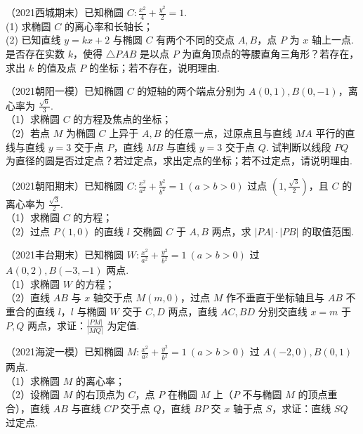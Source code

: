 \begin{exercise} %
（2021西城期末）已知椭圆 $C:\frac{x^{2}}{4}+\frac{y^{2}}{2}=1$.\\
(1) 求椭圆 $C$ 的离心率和长轴长；\\
(2) 已知直线 $y=kx+2$ 与椭圆 $C$ 有两个不同的交点 $A,B$，点 $P$ 为 $x$ 轴上一点. 是否存在实数 $k$，使得 $\triangle PAB$ 是以点 $P$ 为直角顶点的等腰直角三角形？若存在，求出 $k$ 的值及点 $P$ 的坐标；若不存在，说明理由.
\end{exercise}

\begin{exercise} %
（2021朝阳一模）已知椭圆 $C$ 的短轴的两个端点分别为 $A(0,1),B(0,-1)$，离心率为 $\frac{\sqrt{6}}{3}$.\\
（1）求椭圆 $C$ 的方程及焦点的坐标；\\
（2）若点 $M$ 为椭圆 $C$ 上异于 $A,B$ 的任意一点，过原点且与直线 $MA$ 平行的直线与直线 $y=3$ 交于点 $P$，直线 $MB$ 与直线 $y=3$ 交于点 $Q$. 试判断以线段 $PQ$ 为直径的圆是否过定点？若过定点，求出定点的坐标；若不过定点，请说明理由.
\end{exercise}

\begin{exercise} %
（2021朝阳期末）已知椭圆 $C:\frac{x^2}{a^2}+\frac{y^2}{b^2}=1\ (a>b>0)$ 过点 $\left(1,\frac{\sqrt{3}}{2}\right)$，且 $C$ 的离心率为 $\frac{\sqrt{3}}{2}$.\\
（1）求椭圆 $C$ 的方程；\\
（2）过点 $P(1,0)$ 的直线 $l$ 交椭圆 $C$ 于 $A,B$ 两点，求 $\lvert PA\rvert\cdot\lvert PB\rvert$ 的取值范围.
\end{exercise}

\begin{exercise} %
（2021丰台期末）已知椭圆 $W:\frac{x^2}{a^2}+\frac{y^2}{b^2}=1\ (a>b>0)$ 过 $A(0,2),B(-3,-1)$ 两点.\\
（1）求椭圆 $W$ 的方程；\\
（2）直线 $AB$ 与 $x$ 轴交于点 $M(m,0)$，过点 $M$ 作不垂直于坐标轴且与 $AB$ 不重合的直线 $l$，$l$ 与椭圆 $W$ 交于 $C,D$ 两点，直线 $AC,BD$ 分别交直线 $x=m$ 于 $P,Q$ 两点，求证：$\frac{\lvert PM\rvert}{\lvert MQ\rvert}$ 为定值.
\end{exercise}

\begin{exercise} %
（2021海淀一模）已知椭圆 $M:\frac{x^2}{a^2}+\frac{y^2}{b^2}=1\ (a>b>0)$ 过 $A(-2,0),B(0,1)$ 两点.\\
（1）求椭圆 $M$ 的离心率；\\
（2）设椭圆 $M$ 的右顶点为 $C$，点 $P$ 在椭圆 $M$ 上（$P$ 不与椭圆 $M$ 的顶点重合），直线 $AB$ 与直线 $CP$ 交于点 $Q$，直线 $BP$ 交 $x$ 轴于点 $S$，求证：直线 $SQ$ 过定点.
\end{exercise}

\newpage
